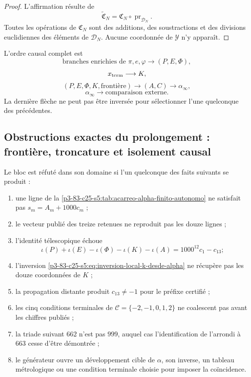 \begin{proof}
L’affirmation résulte de
\[
 \widetilde{\mathfrak C}_N
 =\mathfrak C_N\circ\operatorname{pr}_{\mathscr D_N}.
\]
Toutes les opérations de \(\mathfrak C_N\) sont des additions, des soustractions et des divisions
euclidiennes des éléments de \(\mathscr D_N\). Aucune coordonnée de
\(\mathscr Y\) n’y apparaît.
\end{proof}

L’ordre causal complet est
\[
 \text{branches enrichies de }\pi,e,\varphi
 \longrightarrow(P,E,\Phi),
\]
\[
 x_{\rm term}\longrightarrow K,
\]
\[
 (P,E,\Phi,K,\text{frontière})
 \longrightarrow(A,C)
 \longrightarrow\alpha_\infty,
\]
\[
 \alpha_\infty
 \longrightarrow\text{comparaison externe}.
\]
La dernière flèche ne peut pas être inversée pour sélectionner l’une quelconque des
précédentes.

\subsection{Obstructions exactes du prolongement : frontière, troncature et isolement causal}

\begin{remark}
Le bloc est réfuté dans son domaine si l’un quelconque des faits
suivants se produit :
\begin{enumerate}
 \item une ligne de la \cref{p3-83-c25-s5:tab:acarreo-alpha-finito-autonomo}
       ne satisfait pas \(s_m=A_m+1000c_m\) ;
 \item le vecteur publié des treize retenues ne reproduit pas les douze lignes ;
 \item l’identité télescopique échoue
       \[
       \iota(P)+\iota(E)-\iota(\Phi)-\iota(K)-\iota(A)
       =1000^{12}c_1-c_{13};
       \]
 \item l’inversion \eqref{p3-83-c25-s5:eq:inversion-local-k-desde-alpha} ne récupère pas
       les douze coordonnées de \(K\) ;
 \item la propagation distante produit \(c_{13}\neq-1\) pour le préfixe
       certifié ;
 \item les cinq conditions terminales de
       \(\mathcal C=\{-2,-1,0,1,2\}\) ne coalescent pas avant les chiffres
       publiés ;
 \item la triade suivant \(662\) n’est pas \(999\), auquel cas l’identification
       de l’arrondi à \(663\) cesse d’être démontrée ;
 \item le générateur ouvre un développement cible de \(\alpha\), son inverse,
       un tableau métrologique ou une condition terminale choisie pour imposer
       la coïncidence.
\end{enumerate}
\end{remark}

